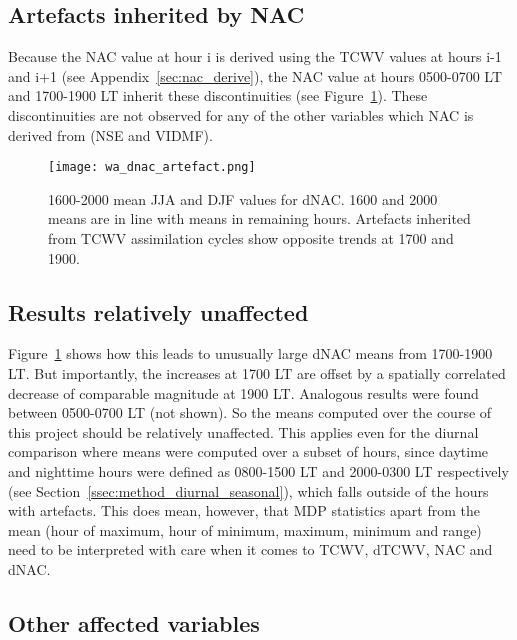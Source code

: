 \subsection{Artefacts inherited by NAC}

Because the \ac{NAC} value at hour i is derived using the \ac{TCWV} values at hours i-1 and i+1 (see Appendix~\ref{sec:nac_derive}), the \ac{NAC} value at hours 0500-0700 \ac{LT} and 1700-1900 \ac{LT} inherit these discontinuities (see Figure~\ref{fig:wa_dnac_artefact}). These discontinuities are not observed for any of the other variables which \ac{NAC} is derived from (\ac{NSE} and \ac{VIDMF}).

\begin{figure}[!htp]
	\centering
	\texttt{[image: wa\_dnac\_artefact.png]}
	\caption[1600-2000 means for dNAC (artefacts)]{1600-2000 mean \ac{JJA} and \ac{DJF} values for \acs{dNAC}. 1600 and 2000 means are in line with means in remaining hours. Artefacts inherited from \ac{TCWV} assimilation cycles show opposite trends at 1700 and 1900.}
	\label{fig:wa_dnac_artefact}
\end{figure}

\subsection{Results relatively unaffected}

Figure~\ref{fig:wa_dnac_artefact} shows how this leads to unusually large \ac{dNAC} means from 1700-1900 \ac{LT}. But importantly, the increases at 1700 \ac{LT} are offset by a spatially correlated decrease of comparable magnitude at 1900 \ac{LT}. Analogous results were found between 0500-0700 \ac{LT} (not shown). So the means computed over the course of this project should be relatively unaffected. This applies even for the diurnal comparison where means were computed over a subset of hours, since daytime and nighttime hours were defined as 0800-1500 \ac{LT} and 2000-0300 \ac{LT} respectively (see Section~\ref{ssec:method_diurnal_seasonal}), which falls outside of the hours with artefacts. This does mean, however, that \ac{MDP} statistics apart from the mean (hour of maximum, hour of minimum, maximum, minimum and range) need to be interpreted with care when it comes to \ac{TCWV}, \ac{dTCWV}, \ac{NAC} and \ac{dNAC}. 

\subsection{Other affected variables}


